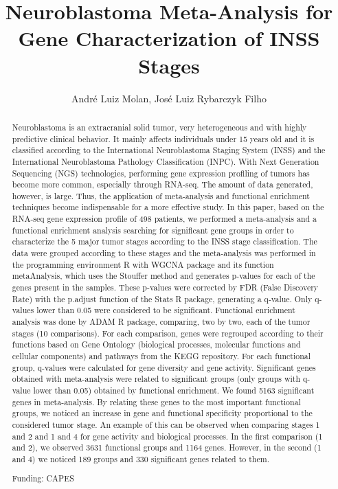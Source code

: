 \documentclass[twoside]{article}
\title{\vspace{-15mm}\fontsize{24pt}{10pt}\selectfont\textbf{ Neuroblastoma Meta-Analysis for Gene Characterization of INSS Stages }} %
\author{ Andr\'e Luiz Molan, Jos\'e Luiz Rybarczyk Filho }
\affil{ Instituto de Bioci\^encias de Botucatu - UNESP }
\date{}
\begin{document}
  
  
  \maketitle %
  
  
  \thispagestyle{fancy} %
  
  
  \begin{abstract}
  Neuroblastoma is an extracranial solid tumor,  very heterogeneous and with highly predictive clinical
behavior. It mainly affects individuals under 15 years old and it is classified according to the International
Neuroblastoma Staging System (INSS) and the International Neuroblastoma Pathology Classification
(INPC). With Next Generation Sequencing (NGS) technologies,  performing gene expression profiling of
tumors has become more common,  especially through RNA-seq. The amount of data generated, 
however,  is large. Thus,  the application of meta-analysis and functional enrichment techniques become
indispensable for a more effective study. In this paper,  based on the RNA-seq gene expression profile of
498 patients,  we performed a meta-analysis and a functional enrichment analysis searching for
significant gene groups in order to characterize the 5 major tumor stages according to the INSS stage
classification. The data were grouped according to these stages and the meta-analysis was performed in
the programming environment R with WGCNA package and its function metaAnalysis,  which uses the
Stouffer method and generates p-values for each of the genes present in the samples. These p-values
were corrected by FDR (False Discovery Rate) with the p.adjust function of the Stats R package, 
generating a q-value. Only q-values lower than 0.05 were considered to be significant. Functional
enrichment analysis was done by ADAM R package,  comparing,  two by two,  each of the tumor stages
(10 comparisons). For each comparison,  genes were regrouped according to their functions based on
Gene Ontology (biological processes,  molecular functions and cellular components) and pathways from
the KEGG repository. For each functional group,  q-values were calculated for gene diversity and gene
activity. Significant genes obtained with meta-analysis were related to significant groups (only groups
with q-value lower than 0.05) obtained by functional enrichment. We found 5163 significant genes in
meta-analysis. By relating these genes to the most important functional groups,  we noticed an increase
in gene and functional specificity proportional to the considered tumor stage. An example of this can be
observed when comparing stages 1 and 2 and 1 and 4 for gene activity and biological processes. In the
first comparison (1 and 2),  we observed 3631 functional groups and 1164 genes. However,  in the second
(1 and 4) we noticed 189 groups and 330 significant genes related to them.
  
  Funding: CAPES \\ 
  \end{abstract}
  
\end{document}
